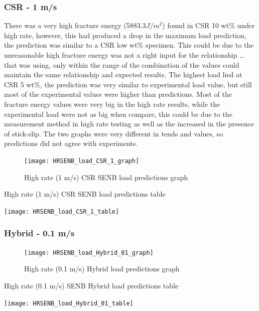 \documentclass[numbers=noendperiod,chapterprefix=on]{icldt} %
\begin{document}
{\subsubsection{CSR - 1 m/s}
 There was a very high fracture energy (5883.3$ J/m^{2} $) found in CSR 10 wt\% under high rate, however, this had produced a drop in the maximum load prediction, the prediction was similar to a CSR low wt\% specimen. This could be due to the unreasonable high fracture energy was not a right input for the relationship … that was using, only within the range of the combination of the values could maintain the same relationship and expected results. 
 The highest load lied at CSR 5 wt\%, the prediction was very similar to experimental load value, but still most of the experimental values were higher than predictions. Most of the fracture energy values were very big in the high rate results, while the experimental load were not as big when compare, this could be due to the measurement method in high rate testing as well as the increased in the presence of stick-slip. 
 The two graphs were very different in tends and values, so predictions did not agree with experiments.
 
 \begin{figure}[!hp]
    \centering
    \texttt{[image: HRSENB\_load\_CSR\_1\_graph]}\label{HRSENB_load_CSR_1_graph}
    \caption{High rate (1 m/s) CSR SENB load predictions graph}
    \end{figure}
   \FloatBarrier
   
   \begin{table}
      \centering
      \caption{High rate (1 m/s) CSR SENB load predictions table}\label{HRSENB_load_CSR_1_table}
      \texttt{[image: HRSENB\_load\_CSR\_1\_table]}
      \end{table}
      \FloatBarrier      
 
 \subsubsection{Hybrid - 0.1 m/s}
 
 \begin{figure}[!hp]
    \centering
    \texttt{[image: HRSENB\_load\_Hybrid\_01\_graph]}\label{HRSENB_load_Hybrid_01_graph}
    \caption{High rate (0.1 m/s) Hybrid load predictions graph}
    \end{figure}
   \FloatBarrier
   
   \begin{table}
      \centering
      \caption{High rate (0.1 m/s) SENB Hybrid load predictions table}\label{HRSENB_load_Hybrid_01_table}
      \texttt{[image: HRSENB\_load\_Hybrid\_01\_table]}
      \end{table}
      \FloatBarrier      
          

}
\end{document}
